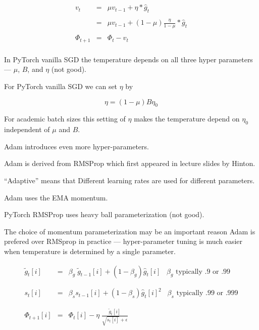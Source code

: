 {\begin{eqnarray*}
  { v_t} & { =} & { \mu v_{t-1} + \eta * \hat{g}_t}\\
  \\
 & { =} & { \mu v_{t-1} + (1-\mu)\frac{\eta}{1-\mu} * \hat{g}_t}\\
  \\
  { \Phi_{t+1}} & { =} & { \Phi_t -  v_t} \\
\end{eqnarray*}

In PyTorch vanilla SGD the temperature depends on all three hyper parameters --- $\mu$,  $B$, and $\eta$ (not good).

For PyTorch vanilla SGD we can set $\eta$ by

\vfill
$$\eta = (1-\mu)B\eta_0$$

\vfill
For academic batch sizes this setting of $\eta$ makes the temperature depend on $\eta_0$ independent of $\mu$ and $B$.


Adam introduces even more hyper-parameters.

\vfill
Adam is derived from RMSProp which first appeared in lecture slides by Hinton.

\vfill
``Adaptive'' means that Different learning rates are used for different parameters.


Adam uses the EMA momentum.

\vfill
PyTorch RMSProp uses heavy ball parameterization (not good).

\vfill
The choice of momentum  parameterization may be an important reason Adam is prefered over RMSprop in practice --- hyper-parameter tuning
is much easier when temperature is determined by a single parameter.


\begin{eqnarray*}
{ \tilde{g}_t[i]} & { =} & \beta_g\;\tilde{g}_{t-1}[i] + (1-\beta_g)\hat{g}_t[i]\;\;\;\mbox{$\beta_g$ typically .9 or .99} \\
\\
\\
{ s_t[i]} & { =} & { \beta_s s_{t-1}[i] + (1-\beta_s)\hat{g}_t[i]^2}\;\;\;\mbox{$\beta_s$ typically .99 or .999} \\
\\
\\
{ \Phi_{t+1}[i]} & { =} & { \Phi_t[i] - \eta\;\frac{\tilde{g}_t[i]}{\sqrt{s_t[i]} + \epsilon}}
\end{eqnarray*}

}
